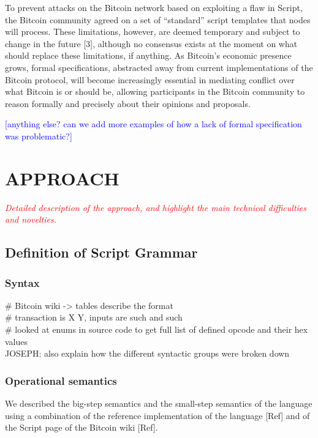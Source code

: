 \documentclass[letterpaper, 10 pt, conference]{ieeeconf}
\begin{document}
To prevent attacks on the Bitcoin network based on exploiting a flaw in Script, the Bitcoin community agreed on a set of ``standard'' script templates that nodes will process. These limitations, however, are deemed temporary and subject to change in the future [3], although no consensus exists at the moment on what should replace these limitations, if anything. As Bitcoin's economic presence grows, formal specifications, abstracted away from current implementations of the Bitcoin protocol, will become increasingly essential in mediating conflict over what Bitcoin is or should be, allowing participants in the Bitcoin community to reason formally and precisely about their opinions and proposals.

\textcolor{blue}{[anything else? can we add more examples of how a lack of formal specification was problematic?]}


\section{APPROACH}

\textcolor{red}{\textit{Detailed description of the approach, and highlight the main technical difficulties and novelties. }}\\

\subsection{Definition of Script Grammar}

\subsubsection{Syntax}
\# Bitcoin wiki -> tables describe the format\\
\# transaction is X Y, inputs are such and such\\
\# looked at enums in source code to get full list of defined opcode and their hex values\\
JOSEPH: also explain how the different syntactic groups were broken down\\

\subsubsection{Operational semantics}

We described the big-step semantics and the small-step semantics of the language using a combination of the reference implementation of the language [Ref] and of the Script page of the Bitcoin wiki [Ref].
\end{document}
